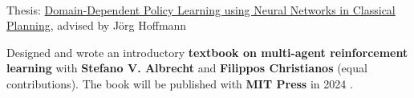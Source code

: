 \documentclass[]{lukas-cv-openfont}
\begin{document}
\noindent
{}
\\
\begin{tightitemize}{1.7em}
    \item Thesis: \href{https://www.lukaschaefer.com/assets/files/bsc_thesis.pdf}{Domain-Dependent Policy Learning using Neural Networks in Classical Planning}, advised by J\"org Hoffmann
\end{tightitemize}

\largesectionsep



\noindent
{}

\vspace{-0.5em}
\begin{flushleft}
    Designed and wrote an introductory \textbf{textbook on multi-agent reinforcement learning} with \textbf{Stefano V. Albrecht} and \textbf{Filippos Christianos} (equal contributions). The book will be published with \textbf{MIT Press} in 2024 \cite{albrecht2024multi}.
\end{flushleft}
\sectionsep
\end{document}
